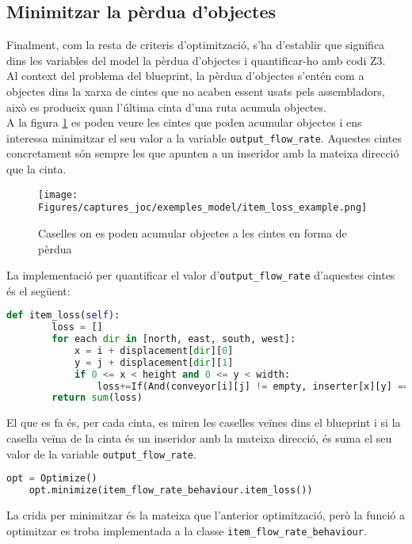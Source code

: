 \subsection{Minimitzar la pèrdua d'objectes}
Finalment, com la resta de criteris d'optimització, s'ha d'establir que significa dins les variables del model la pèrdua d'objectes i quantificar-ho amb codi Z3.\\
Al context del problema del blueprint, la pèrdua d'objectes s'entén com a objectes dins la xarxa de cintes que no acaben essent usats pels assembladors, això es produeix quan l'última cinta d'una ruta acumula objectes.\\
A la figura \ref{fig:item_loss_example} es poden veure les cintes que poden acumular objectes i ens interessa minimitzar el seu valor a la variable \lstinline{output_flow_rate}. Aquestes cintes concretament són sempre les que apunten a un inseridor amb la mateixa direcció que la cinta.
\begin{figure}[H]
    \centering
    \texttt{[image: Figures/captures\_joc/exemples\_model/item\_loss\_example.png]}
    \caption{Caselles on es poden acumular objectes a les cintes en forma de pèrdua}
    \label{fig:item_loss_example}
\end{figure}
La implementació per quantificar el valor d'\lstinline{output_flow_rate} d'aquestes cintes és el següent:

\begin{lstlisting}[language=Python, caption=Quantitat de pèrdua d'objectes]
    def item_loss(self):
        loss = []
        for each dir in [north, east, south, west]:
            x = i + displacement[dir][0]
            y = j + displacement[dir][1]
            if 0 <= x < height and 0 <= y < width:
                loss+=If(And(conveyor[i][j] != empty, inserter[x][y] == conveyor[i][j]), output_flow_rate[i][j], 0)
        return sum(loss)
\end{lstlisting}

El que es fa és, per cada cinta, es miren les caselles veïnes dins el blueprint i si la casella veïna de la cinta és un inseridor amb la mateixa direcció, és suma el seu valor de la variable \lstinline{output_flow_rate}.\\

\begin{lstlisting}[language=Python, caption=Minimitzar el criteri]
    opt = Optimize()
    opt.minimize(item_flow_rate_behaviour.item_loss())
\end{lstlisting}

La crida per minimitzar és la mateixa que l'anterior optimització, però la funció a optimitzar es troba implementada a la classe \lstinline{item_flow_rate_behaviour}.


